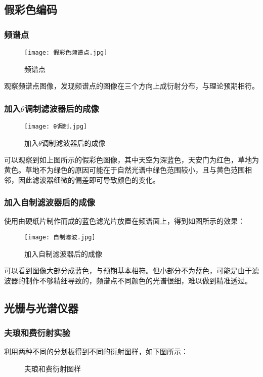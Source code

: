 \documentclass[UTF-8,twoside,cs4size]{ctexart}
\begin{document}
\subsection{假彩色编码}
\subsubsection{频谱点}
\begin{figure}[!h]
    \centering
    \texttt{[image: 假彩色频谱点.jpg]}
    \caption{频谱点}
\end{figure}
观察频谱点图像，发现频谱点的图像在三个方向上成衍射分布，与理论预期相符。
\subsubsection{加入$\theta$调制滤波器后的成像}
\begin{figure}[!h]
    \centering
    \texttt{[image: θ调制.jpg]}
    \caption{加入$\theta$调制滤波器后的成像}
\end{figure}
可以观察到如上图所示的假彩色图像，其中天空为深蓝色，天安门为红色，草地为黄色。草地不为绿色的原因可能在于自然光谱中绿色范围较小，且与黄色范围相邻，因此滤波器细微的偏差即可导致颜色的变化。

\subsubsection{加入自制滤波器后的成像}
使用由硬纸片制作而成的蓝色滤光片放置在频谱面上，得到如图所示的效果：
\begin{figure}[!h]
    \centering
    \texttt{[image: 自制滤波.jpg]}
    \caption{加入自制滤波器后的成像}
\end{figure}
可以看到图像大部分成蓝色，与预期基本相符。但小部分不为蓝色，可能是由于滤波器的制作不够精细导致的，频谱点不同颜色的光谱很细，难以做到精准透过。

\subsection{光栅与光谱仪器}
\subsubsection{夫琅和费衍射实验}
利用两种不同的分划板得到不同的衍射图样，如下图所示：
\begin{figure}[!h]
    \centering
    \caption{夫琅和费衍射图样}
    \label{fig:group}
\end{figure}
\end{document}
